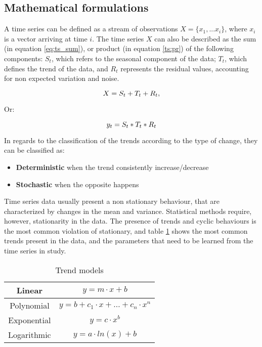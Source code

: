 \subsection{Mathematical formulations} \label{sec:math_form}

A time series can be defined as a stream of observations $X = \{x_1, ... x_i\}$, where $x_i$ is a vector arriving at time $i$. The time series $X$ can also be
described as the sum (in equation \ref{eq:ts_sum}), or product (in equation \ref{ts:pr}) of the following components: $S_t$, which refers to the seasonal component
of the data; $T_t$, which defines the trend of the data, and $R_t$ represents the residual values, accounting for non expected variation and noise.

\begin {equation}
\centering
X = S_t + T_t + R_t
\label{eq:ts_sum},
\end {equation}

Or:

\begin {equation}
\centering
y_t = S_t * T_t * R_t
\label{ts:pr}
\end {equation}

\par In regards to the classification of the trends according to the type of change, they can be classified as:

\begin {itemize}
  \item \textbf {Deterministic} when the trend consistently increase/decrease
  \item \textbf {Stochastic} when the opposite happens
\end {itemize}

\par Time series data usually present a non stationary behaviour, that are characterized by changes in the mean and variance. Statistical methods require, however,
stationarity in the data. The presence of trends and cyclic behaviours is the most common violation of stationary, and table \ref{tab:trends_here} shows the most 
common trends present in the data, and the parameters that need to be learned from the time series in study. 

\begin{table}[h]
\centering
\begin{tabular}{c|c}
Linear      & $y = m \cdot x + b$ \\ \hline
Polynomial  & $y = b + c_1 \cdot x + \dotso + c_n \cdot x^n$  \\ \hline
Exponential & $y = c \cdot  x^b$     \\ \hline
Logarithmic & $y = a \cdot ln(x) + b$
\end{tabular}
\caption{Trend models}
\label{tab:trends_here}
\end{table}

